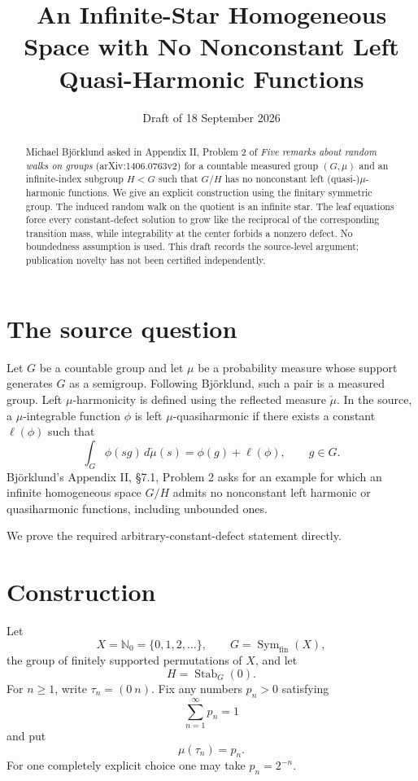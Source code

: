 \documentclass[11pt]{article}
\title{An Infinite-Star Homogeneous Space with No Nonconstant Left Quasi-Harmonic Functions}
\author{}
\date{Draft of 18 September 2026}
\begin{document}
\maketitle

\begin{abstract}
Michael Bj\"orklund asked in Appendix II, Problem 2 of \emph{Five remarks about random walks on groups} (arXiv:1406.0763v2) for a countable measured group $(G,\mu)$ and an infinite-index subgroup $H<G$ such that $G/H$ has no nonconstant left (quasi-)$\mu$-harmonic functions. We give an explicit construction using the finitary symmetric group. The induced random walk on the quotient is an infinite star. The leaf equations force every constant-defect solution to grow like the reciprocal of the corresponding transition mass, while integrability at the center forbids a nonzero defect. No boundedness assumption is used. This draft records the source-level argument; publication novelty has not been certified independently.
\end{abstract}

\section{The source question}
Let $G$ be a countable group and let $\mu$ be a probability measure whose support generates $G$ as a semigroup. Following Bj\"orklund, such a pair is a measured group. Left $\mu$-harmonicity is defined using the reflected measure $\check\mu$. In the source, a $\mu$-integrable function $\phi$ is left $\mu$-quasiharmonic if there exists a constant $\ell(\phi)$ such that
\[
\int_G \phi(sg)\,d\check\mu(s)=\phi(g)+\ell(\phi),\qquad g\in G.
\]
Bj\"orklund's Appendix II, \S7.1, Problem 2 asks for an example for which an infinite homogeneous space $G/H$ admits no nonconstant left harmonic or quasiharmonic functions, including unbounded ones.

We prove the required arbitrary-constant-defect statement directly.

\section{Construction}
Let
\[
X=\mathbb N_0=\{0,1,2,\ldots\},\qquad G=\operatorname{Sym}_{\mathrm{fin}}(X),
\]
the group of finitely supported permutations of $X$, and let
\[
H=\operatorname{Stab}_G(0).
\]
For $n\ge1$, write $\tau_n=(0\ n)$. Fix any numbers $p_n>0$ satisfying
\[
\sum_{n=1}^{\infty}p_n=1
\]
and put
\[
\mu(\tau_n)=p_n.
\]
For one completely explicit choice one may take $p_n=2^{-n}$.
\end{document}
